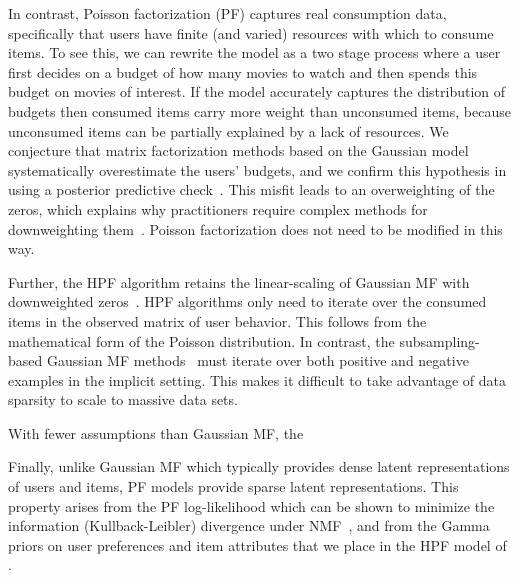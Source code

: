 In contrast, Poisson factorization (PF) captures real consumption
data, specifically that users have finite (and varied) resources with
which to consume items.  To see this, we can rewrite the model as a
two stage process where a user first decides on a budget of how many
movies to watch and then spends this budget on movies of interest. If
the model accurately captures the distribution of budgets then
consumed items carry more weight than unconsumed items, because
unconsumed items can be partially explained by a lack of resources. We
conjecture that matrix factorization methods based on the Gaussian
model systematically overestimate the users' budgets, and we confirm
this hypothesis in  using a posterior predictive
check~\cite{Gelman:1996}. This misfit leads to an overweighting of the
zeros, which explains why practitioners require complex methods for
downweighting
them~\cite{Hu:2008p9402,Gantner:2012p9364,Dror:2012a,Paquet:2013p9197}.
Poisson factorization does not need to be modified in this way.

Further, the HPF algorithm retains the linear-scaling of Gaussian MF
with downweighted zeros~\cite{Hu:2008p9402}. HPF algorithms only need
to iterate over the consumed items in the observed matrix of user
behavior. This follows from the mathematical form of the Poisson
distribution.  In contrast, the subsampling-based Gaussian MF
methods~\cite{Gantner:2012p9364, Dror:2012a,Paquet:2013p9197} must
iterate over both positive and negative examples in the implicit
setting. This makes it difficult to take advantage of data sparsity to
scale to massive data sets.

With fewer assumptions than Gaussian MF, the 

Finally, unlike Gaussian MF which typically provides dense latent
representations of users and items, PF models provide sparse latent
representations. This property arises from the PF log-likelihood which
can be shown to minimize the information (Kullback-Leibler) divergence
under NMF~\cite{Cemgil:2009}, and from the Gamma priors on user
preferences and item attributes that we place in the HPF model of
.

